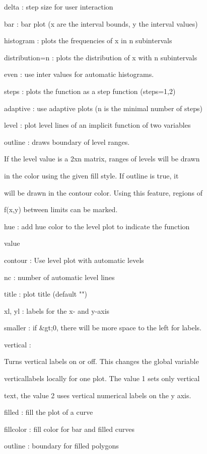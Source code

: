 \documentclass{article}
\begin{document}
delta     : step size for user interaction


bar       : bar plot (x are the interval bounds, y the interval values)


histogram : plots the frequencies of x in n subintervals


distribution=n : plots the distribution of x with n subintervals


even      : use inter values for automatic histograms.


steps     : plots the function as a step function (steps=1,2)


adaptive  : use adaptive plots (n is the minimal number of steps)


level     : plot level lines of an implicit function of two variables


outline   : draws boundary of level ranges.




If the level value is a 2xn matrix, ranges of levels will be drawn


in the color using the given fill style. If outline is true, it


will be drawn in the contour color. Using this feature, regions of


f(x,y) between limits can be marked.




hue       : add hue color to the level plot to indicate the function


            value


contour   : Use level plot with automatic levels


nc        : number of automatic level lines


title     : plot title (default "")


xl, yl    : labels for the x- and y-axis


smaller   : if &gt;0, there will be more space to the left for labels.


vertical  :


  Turns vertical labels on or off. This changes the global variable


  verticallabels locally for one plot. The value 1 sets only vertical


  text, the value 2 uses vertical numerical labels on the y axis.


filled    : fill the plot of a curve


fillcolor : fill color for bar and filled curves


outline   : boundary for filled polygons
\end{document}
